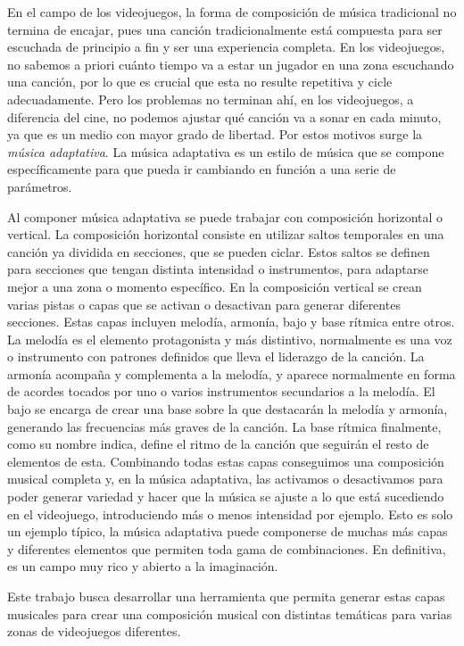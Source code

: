 En el campo de los videojuegos, la forma de composición de música tradicional no termina de encajar, pues una canción tradicionalmente está compuesta para ser escuchada de principio a fin y ser una experiencia completa. En los videojuegos, no sabemos a priori cuánto tiempo va a estar un jugador en una zona escuchando una canción, por lo que es crucial que esta no resulte repetitiva y cicle adecuadamente. Pero los problemas no terminan ahí, en los videojuegos, a diferencia del cine, no podemos ajustar qué canción va a sonar en cada minuto, ya que es un medio con mayor grado de libertad. Por estos motivos surge la \textit{música adaptativa}. La música adaptativa es un estilo de música que se compone específicamente para que pueda ir cambiando en función a una serie de parámetros.

Al componer música adaptativa se puede trabajar con composición horizontal o vertical. La composición horizontal consiste en utilizar saltos temporales en una canción ya dividida en secciones, que se pueden ciclar. Estos saltos se definen para secciones que tengan distinta intensidad o instrumentos, para adaptarse mejor a una zona o momento específico. En la composición vertical se crean varias pistas o capas que se activan o desactivan para generar diferentes secciones. Estas capas incluyen melodía, armonía, bajo y base rítmica entre otros. La melodía es el elemento protagonista y más distintivo, normalmente es una voz o instrumento con patrones definidos que lleva el liderazgo de la canción. La armonía acompaña y complementa a la melodía, y aparece normalmente en forma de acordes tocados por uno o varios instrumentos secundarios a la melodía. El bajo se encarga de crear una base sobre la que destacarán la melodía y armonía, generando las frecuencias más graves de la canción. La base rítmica finalmente, como su nombre indica, define el ritmo de la canción que seguirán el resto de elementos de esta. Combinando todas estas capas conseguimos una composición musical completa y, en la música adaptativa, las activamos o desactivamos para poder generar variedad y hacer que la música se ajuste a lo que está sucediendo en el videojuego, introduciendo más o menos intensidad por ejemplo. Esto es solo un ejemplo típico, la música adaptativa puede componerse de muchas más capas y diferentes elementos que permiten toda gama de combinaciones. En definitiva, es un campo muy rico y abierto a la imaginación.

Este trabajo busca desarrollar una herramienta que permita generar estas capas musicales para crear una composición musical con distintas temáticas para varias zonas de videojuegos diferentes.

